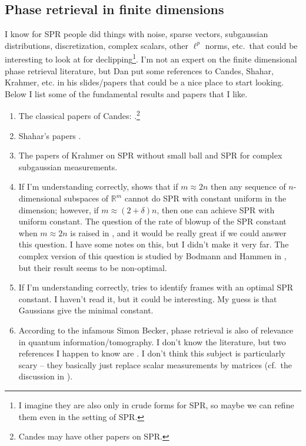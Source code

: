 \documentclass[12pt,leqno]{amsart}
\numberwithin{equation}{section}
\theoremstyle{plain}
\theoremstyle{definition}
\begin{document}
\subsection{Phase retrieval in finite dimensions}
 I know for SPR people did things with noise, sparse vectors, subgaussian distributions, discretization, complex scalars, other $\ell^p$ norms, etc.~that could be interesting to look at for declipping\footnote{I imagine they are also only in crude forms for SPR, so maybe we can refine them even in the setting of SPR.}. I'm not an expert on the finite dimensional phase retrieval literature, but Dan put some references to Candes, Shahar, Krahmer, etc. in his slides/papers that could be a nice place to start looking. Below I list some of the fundamental results and papers that I like.
\begin{enumerate}
\item The classical papers of Candes: \cite{MR3260258,MR3069958}.\footnote{Candes may have other papers on SPR.}
\item Shahar's papers \cite{eldarmendelson,MR3354617}.
\item The papers of  Krahmer \cite{MR3746047,KS} on SPR without small ball and SPR for complex subgaussian measurements.
\item If I'm understanding correctly, \cite{MR3323113} shows that if $m\approx 2n$ then any sequence of $n$-dimensional subspaces of $\mathbb{R}^m$ cannot do SPR with constant uniform in the dimension; however, if $m\approx (2+\delta)n$, then one can achieve SPR with uniform constant. The question of the rate of blowup of the SPR constant when $m\approx 2n$ is raised in \cite[Section 5]{MR3323113}, and it would be really great if we could answer this question. I have some notes on this, but I didn't make it very far. The complex version of this question is studied by Bodmann and Hammen in \cite{MR3683672}, but their result seems to be non-optimal.
\item If I'm understanding correctly, \cite{xia2024stability} tries to identify frames with an optimal SPR constant. I haven't read it, but it could be interesting. My guess is that Gaussians give the minimal constant.
\item According to the infamous Simon Becker, phase retrieval is also of relevance in quantum information/tomography. I don't know the literature, but two references I happen to know are \cite{MR4477807,liu2023phase}. I don't think this subject is particularly scary -- they basically just replace scalar measurements by matrices (cf.~the discussion in \cite{MR3323113}).
\end{enumerate}
 
\end{document}
